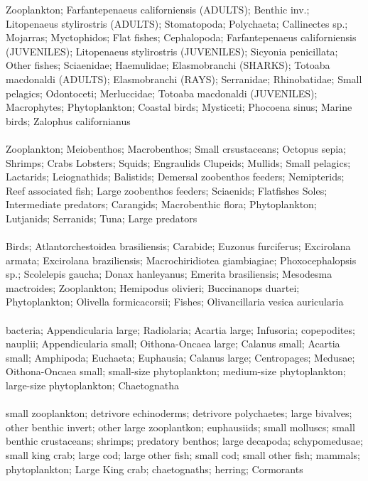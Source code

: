 \hline
Zooplankton; Farfantepenaeus californiensis (ADULTS); Benthic inv.; Litopenaeus stylirostris (ADULTS); Stomatopoda; Polychaeta; Callinectes sp.; Mojarras; Myctophidos; Flat fishes; Cephalopoda; Farfantepenaeus californiensis (JUVENILES); Litopenaeus stylirostris (JUVENILES); Sicyonia penicillata; Other fishes; Sciaenidae; Haemulidae; Elasmobranchi (SHARKS); Totoaba macdonaldi (ADULTS); Elasmobranchi (RAYS); Serranidae; Rhinobatidae; Small pelagics; Odontoceti; Merluccidae; Totoaba macdonaldi (JUVENILES); Macrophytes; Phytoplankton; Coastal birds; Mysticeti; Phocoena sinus; Marine birds; Zalophus californianus\\
\fullhline
\hline
{} \\
\hline
Zooplankton; Meiobenthos; Macrobenthos; Small crsustaceans; Octopus sepia; Shrimps; Crabs Lobsters; Squids; Engraulids Clupeids; Mullids; Small pelagics; Lactarids; Leiognathids; Balistids; Demersal zoobenthos feeders; Nemipterids; Reef associated fish; Large zoobenthos feeders; Sciaenids; Flatfishes Soles; Intermediate predators; Carangids; Macrobenthic flora; Phytoplankton; Lutjanids; Serranids; Tuna; Large predators\\
\fullhline
\hline
{} \\
\hline
Birds; Atlantorchestoidea brasiliensis; Carabide; Euzonus furciferus; Excirolana armata; Excirolana braziliensis; Macrochiridiotea giambiagiae; Phoxocephalopsis sp.; Scolelepis gaucha; Donax hanleyanus; Emerita brasiliensis; Mesodesma mactroides; Zooplankton; Hemipodus olivieri; Buccinanops duartei; Phytoplankton; Olivella formicacorsii; Fishes; Olivancillaria vesica auricularia\\
\fullhline
\hline
{} \\
\hline
bacteria; Appendicularia large; Radiolaria; Acartia  large; Infusoria; copepodites; nauplii; Appendicularia small; Oithona-Oncaea large; Calanus small; Acartia small; Amphipoda; Euchaeta; Euphausia; Calanus large; Centropages; Medusae; Oithona-Oncaea small; small-size phytoplankton; medium-size phytoplankton; large-size phytoplankton; Chaetognatha\\
\fullhline
\hline
{} \\
\hline
small zooplankton; detrivore echinoderms; detrivore polychaetes; large bivalves; other benthic invert; other large zooplantkon; euphausiids; small molluscs; small benthic crustaceans; shrimps; predatory benthos; large decapoda; schypomedusae; small king crab; large cod; large other fish; small cod; small other fish; mammals; phytoplankton; Large King crab; chaetognaths; herring; Cormorants\\
